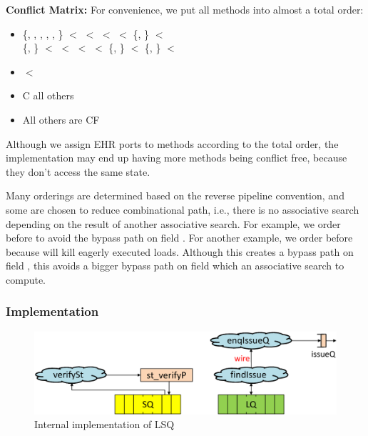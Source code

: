 \noindent\textbf{Conflict Matrix:}
For convenience, we put all methods into almost a total order:
\begin{itemize}
    \item \{, , , , , \} $<$  $<$  $<$  $<$ \{, \} $<$ \\ \{, \} $<$  $<$  $<$  $<$ \{, \} $<$ \{, \} $<$ 
    \item {} $<$ 
    \item {} C all others
    \item All others are CF
\end{itemize}
Although we assign EHR ports to methods according to the total order, the implementation may end up having more methods being conflict free, because they don't access the same state.

Many orderings are determined based on the reverse pipeline convention, and some are chosen to reduce combinational path, i.e., there is no associative search depending on the result of another associative search.
For example, we order  before  to avoid the bypass path on field .
For another example, we order  before  because  will kill eagerly executed loads.
Although this creates a bypass path on field , this avoids a bigger bypass path on field  which an associative search to compute.

\subsubsection{Implementation}

\begin{figure}
    \centering
    \includegraphics[width=0.7\columnwidth]{fig/lsq_crop.pdf}
    \caption{Internal implementation of LSQ}\label{fig:lsq-impl}
\end{figure}

